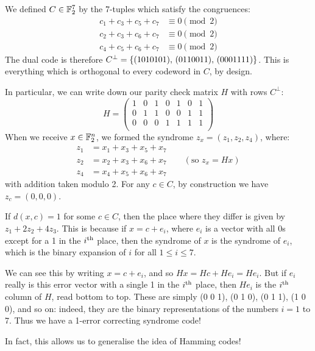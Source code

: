 \documentclass{article}
\begin{document}
\begin{example}
	\label{hamming-original-code-redux}
    We defined $C \in \mathbb{F}_2^7$ by the 7-tuples
    which satisfy the congruences:
    \begin{align*}
    	c_1 + c_3 + c_5 + c_7 &\equiv 0 \pmod 2 \\
    	c_2 + c_3 + c_6 + c_7 &\equiv 0 \pmod 2 \\
    	c_4 + c_5 + c_6 + c_7 &\equiv 0 \pmod 2
	\end{align*}
	The dual code is therefore $C^\bot = \left\lbrace (1010101), \, (0110011), \, (0001111) \right\rbrace$.
	This is everything which is orthogonal to every codeword in $C$, by design.
	
	In particular, we can write down our parity check matrix $H$ with rows $C^\bot$:
	\[
	H = \begin{pmatrix}
		1 & 0 & 1 & 0 & 1 & 0 & 1 \\
		0 & 1 & 1 & 0 & 0 & 1 & 1 \\
		0 & 0 & 0 & 1 & 1 & 1 & 1 \\
	\end{pmatrix}
	\]
	When we receive $x \in \mathbb{F}_2^n$, we formed the syndrome $z_x = (z_1, z_2, z_4)$, where:
	\begin{align*}
    	z_1 &= x_1 + x_3 + x_5 + x_7 \\
    	z_2 &= x_2 + x_3 + x_6 + x_7 \qquad (\text{so } z_x = H x) \\
    	z_4 &= x_4 + x_5 + x_6 + x_7
	\end{align*}
	with addition taken modulo 2.
	For any $c \in C$, by construction we have $z_c = (0, 0, 0)$.
	
	If $d(x, c) = 1$ for some $c \in C$,
	then the place where they differ is given by $z_1 + 2z_2 + 4z_3$.
	This is because if $x = c + e_i$,
	where $e_i$ is a vector with all 0s
	except for a 1 in the $i^{\text{th}}$ place,
	then the syndrome of $x$ is the syndrome of $e_i$,
	which is the binary expansion of $i$ for all $1 \leq i \leq 7$.
	
	We can see this by writing $x = c + e_i$, and so $Hx = Hc + He_i = He_i$.
	But if $e_i$ really is this error vector with a single 1 in the $i^{\text{th}}$ place, then $He_i$ is the $i^{\text{th}}$ column of $H$, read bottom to top.
	These are simply (0 0 1), (0 1 0), (0 1 1), (1 0 0), and so on: indeed, they are the binary representations of the numbers $i = 1$ to 7. Thus we have a 1-error correcting syndrome code!
\end{example}

In fact, this allows us to generalise the idea of Hamming codes!
\end{document}
